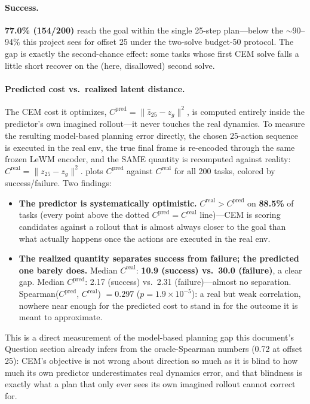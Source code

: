 \documentclass[11pt]{article}
\newcommand{\z}{z}
\begin{document}
\paragraph{Success.} \textbf{77.0\% (154/200)} reach the goal within the single 25-step
plan---below the $\sim$90--94\% this project sees for offset 25 under the two-solve budget-50
protocol. The gap is exactly the second-chance effect: some tasks whose first CEM solve falls
a little short recover on the (here, disallowed) second solve.

\paragraph{Predicted cost vs.\ realized latent distance.} The CEM cost it optimizes,
$C^{\mathrm{pred}}=\|\hat\z_{25}-\z_g\|^2$, is computed entirely inside the predictor's own
imagined rollout---it never touches the real dynamics. To measure the resulting model-based
planning error directly, the chosen 25-action sequence is executed in the real env, the true
final frame is re-encoded through the same frozen LeWM encoder, and the SAME quantity is
recomputed against reality: $C^{\mathrm{real}}=\|\z_{25}-\z_g\|^2$. 
plots $C^{\mathrm{pred}}$ against $C^{\mathrm{real}}$ for all 200 tasks, colored by
success/failure. Two findings:
\begin{itemize}[nosep]
  \item \textbf{The predictor is systematically optimistic.} $C^{\mathrm{real}} >
  C^{\mathrm{pred}}$ on \textbf{88.5\%} of tasks (every point above the dotted
  $C^{\mathrm{pred}}=C^{\mathrm{real}}$ line)---CEM is scoring candidates against a rollout
  that is almost always closer to the goal than what actually happens once the actions are
  executed in the real env.
  \item \textbf{The realized quantity separates success from failure; the predicted one
  barely does.} Median $C^{\mathrm{real}}$: \textbf{10.9 (success) vs.\ 30.0 (failure)}, a
  clear gap. Median $C^{\mathrm{pred}}$: 2.17 (success) vs.\ 2.31 (failure)---almost no
  separation. Spearman($C^{\mathrm{pred}}$, $C^{\mathrm{real}}$) $=0.297$ ($p=1.9\times
  10^{-5}$): a real but weak correlation, nowhere near enough for the predicted cost to
  stand in for the outcome it is meant to approximate.
\end{itemize}
This is a direct measurement of the model-based planning gap this document's Question
section already infers from the oracle-Spearman numbers (0.72 at offset 25): CEM's objective
is not wrong about direction so much as it is blind to how much its own predictor
underestimates real dynamics error, and that blindness is exactly what a plan that only ever
sees its own imagined rollout cannot correct for.
\end{document}
